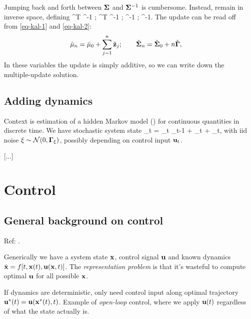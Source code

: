 \documentclass[notitlepage,openany,11pt]{report}
\theoremstyle{plain}%
\numberwithin{equation}{section}
\begin{document}
Jumping back and forth between $\mathbf{\Sigma}$ and $\mathbf{\Sigma}^{-1}$ is cumbersome. Instead, remain in inverse space, defining
\be
\check{\mbf{\Gamma}} \equiv {}^{T} \mbf{\Gamma}^{-1} ; \qquad {} \equiv {}^{T} \mbf{\Gamma}^{-1} ; 
\qquad \check{\mbf{\mu}} \equiv \mbf{\Sigma}^{-1} \mbf \mu; \qquad \check{\mbf{\Sigma}} \equiv \mbf{\Sigma}^{-1}. 
\ee
The update can be read off from \eqref{eq-kal-1} and \eqref{eq-kal-2}:
\begin{equation}
\check{\mathbf{\mu}}_{n} = \check{\mathbf{\mu}}_{0} + \sum_{j=1}^{n} \check{\mathbf{z}}_j; \qquad \check{\mathbf{\Sigma}}_n = \check{\mathbf{\Sigma}}_0 + n \check{\mathbf{\Gamma}},
\end{equation}
In these variables the update is simply additive, so we can write down the multiple-update solution.



\subsection{Adding dynamics}

Context is estimation of a hidden Markov model () for continuous quantities in discrete time. We have stochastic system state 
\be
{}_{t} = _{t} _{t-1} +  _{t} + \xi_{t},
\ee
with iid noise $\xi \sim \mathcal{N}(0, \mathbf{\Gamma}_{\xi})$, possibly depending on control input $\mathbf{u}_{t}$.

[...]

\section{Control}

\subsection{General background on control}
Ref: \cite{KappenRuiz:16}.

Generically we have a system state $\mathbf{x}$, control signal $\mathbf{u}$ and known dynamics $\dot{\mathbf{x}} = f[t, \mathbf{x}(t), \mathbf{u}(\mathbf{x},t)]$. The \emph{representation problem} is that it's wasteful to compute optimal $\mathbf{u}$ for all possible $\mathbf{x}$.

If dynamics are deterministic, only need control input along optimal trajectory $\mathbf{u}^{\ast}(t) = \mathbf{u}(\mathbf{x}^{\ast}(t), t)$. Example of \emph{open-loop} control, where we apply $\mathbf{u}(t)$ regardless of what the state actually is. 
\end{document}
